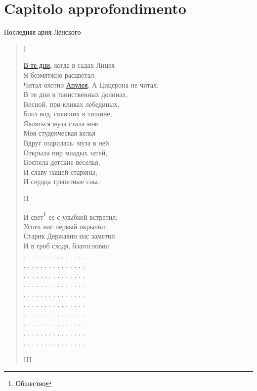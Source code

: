 \chapter{Capitolo approfondimento}\label{section:app}%


Последняя ария Ленского
\begin{verse}



I

\hyperref[sec:musa]{В те дни,} когда в садах Лицея\\
Я безмятжно расцветал,\\
Читал охотно \hyperref[apuleia]{Апулея},
А Цицерона не читал,\\
В те дни в таинственных долинах,\\
Весной, при кликах лебединых,\\
Близ вод, сиявших в тишине,\\
Являться муза стала мне.\\
Моя студенческая келья\\
Вдруг озарилась: муза в ней\\
Открыла пир младых затей,\\
Воспела детские веселья,\\
И славу нашей старины,\\
И сердца трепетные сны.

II

И свет\footnote{Обшество} ее с улыбкой встретил;\\
Успех нас первый окрылил;\\
Старик Державин нас заметил\\
И в гроб сходя, благословил.\\
. . . . . . . . . . . . . . .\\
. . . . . . . . . . . . . . .\\
. . . . . . . . . . . . . . .\\
. . . . . . . . . . . . . . .\\
. . . . . . . . . . . . . . .\\
. . . . . . . . . . . . . . .\\
. . . . . . . . . . . . . . .\\
. . . . . . . . . . . . . . .\\
. . . . . . . . . . . . . . .\\
. . . . . . . . . . . . . . .

III


\end{verse}

